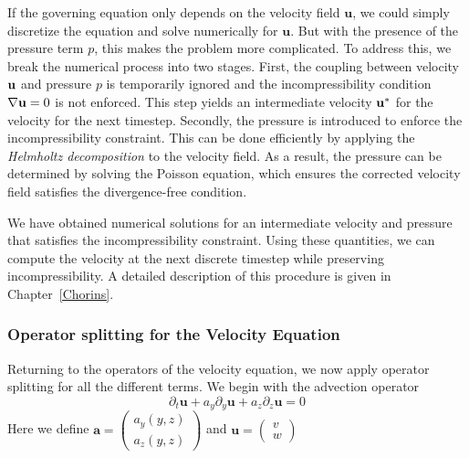 If the governing equation only depends on the velocity field $\textbf{u}$,
we could simply discretize the equation and solve numerically for 
$\textbf{u}$. But with the presence of the pressure term $p$, this makes
the problem more complicated. To address this, we break the numerical
process into two stages. First, the coupling between velocity $\textbf u$
and pressure $p$ is temporarily ignored and the incompressibility
condition $\nabla \textbf u = 0$ is not enforced. This step yields an
intermediate velocity $\textbf u^*$ for the velocity for the next
timestep. Secondly, the pressure is introduced to enforce the
incompressibility constraint. This can be done efficiently by applying the
\textit{Helmholtz decomposition} to the velocity field. As a result, the
pressure can be determined by solving the Poisson equation, which ensures
the corrected velocity field satisfies the divergence-free condition.

We have obtained numerical solutions for an intermediate velocity and
pressure that satisfies the incompressibility constraint. Using these
quantities, we can compute the velocity at the next discrete timestep
while preserving incompressibility. A detailed description of this
procedure is given in Chapter~\ref{Chorins}.

\subsubsection{Operator splitting for the Velocity Equation}

Returning to the operators of the velocity equation, we now apply
operator splitting for all the different terms.
We begin with the advection operator
$$\partial_t \bm{u} + a_y\partial_y \bm{u} + a_z\partial_z\bm{u} = 0$$
Here we define
$
\bm{a} = 
\begin{pmatrix}
    a_y(y,z) \\
    a_z(y,z)
\end{pmatrix}$
and 
$\bm{u} = \begin{pmatrix}
    v \\
    w
\end{pmatrix}$

